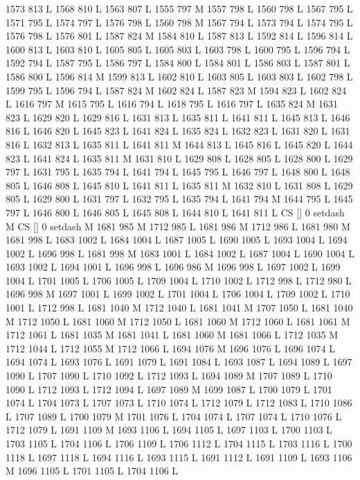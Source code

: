 {{{{{{{{{{{{{{{{{{{{{{{{{{{1573 813 L
1568 810 L
1563 807 L
1555 797 M 1557 798 L
1560 798 L
1567 795 L
1571 795 L
1574 797 L
1576 798 L
1560 798 M 1567 794 L
1573 794 L
1574 795 L
1576 798 L
1576 801 L
1587 824 M 1584 810 L
1587 813 L
1592 814 L
1596 814 L
1600 813 L
1603 810 L
1605 805 L
1605 803 L
1603 798 L
1600 795 L
1596 794 L
1592 794 L
1587 795 L
1586 797 L
1584 800 L
1584 801 L
1586 803 L
1587 801 L
1586 800 L
1596 814 M 1599 813 L
1602 810 L
1603 805 L
1603 803 L
1602 798 L
1599 795 L
1596 794 L
1587 824 M 1602 824 L
1587 823 M 1594 823 L
1602 824 L
1616 797 M 1615 795 L
1616 794 L
1618 795 L
1616 797 L
1635 824 M 1631 823 L
1629 820 L
1629 816 L
1631 813 L
1635 811 L
1641 811 L
1645 813 L
1646 816 L
1646 820 L
1645 823 L
1641 824 L
1635 824 L
1632 823 L
1631 820 L
1631 816 L
1632 813 L
1635 811 L
1641 811 M 1644 813 L
1645 816 L
1645 820 L
1644 823 L
1641 824 L
1635 811 M 1631 810 L
1629 808 L
1628 805 L
1628 800 L
1629 797 L
1631 795 L
1635 794 L
1641 794 L
1645 795 L
1646 797 L
1648 800 L
1648 805 L
1646 808 L
1645 810 L
1641 811 L
1635 811 M 1632 810 L
1631 808 L
1629 805 L
1629 800 L
1631 797 L
1632 795 L
1635 794 L
1641 794 M 1644 795 L
1645 797 L
1646 800 L
1646 805 L
1645 808 L
1644 810 L
1641 811 L
CS [] 0 setdash M
CS [] 0 setdash M
1681 985 M 1712 985 L
1681 986 M 1712 986 L
1681 980 M 1681 998 L
1683 1002 L
1684 1004 L
1687 1005 L
1690 1005 L
1693 1004 L
1694 1002 L
1696 998 L
1681 998 M 1683 1001 L
1684 1002 L
1687 1004 L
1690 1004 L
1693 1002 L
1694 1001 L
1696 998 L
1696 986 M 1696 998 L
1697 1002 L
1699 1004 L
1701 1005 L
1706 1005 L
1709 1004 L
1710 1002 L
1712 998 L
1712 980 L
1696 998 M 1697 1001 L
1699 1002 L
1701 1004 L
1706 1004 L
1709 1002 L
1710 1001 L
1712 998 L
1681 1040 M 1712 1040 L
1681 1041 M 1707 1050 L
1681 1040 M 1712 1050 L
1681 1060 M 1712 1050 L
1681 1060 M 1712 1060 L
1681 1061 M 1712 1061 L
1681 1035 M 1681 1041 L
1681 1060 M 1681 1066 L
1712 1035 M 1712 1044 L
1712 1055 M 1712 1066 L
1694 1076 M 1696 1076 L
1696 1074 L
1694 1074 L
1693 1076 L
1691 1079 L
1691 1084 L
1693 1087 L
1694 1089 L
1697 1090 L
1707 1090 L
1710 1092 L
1712 1093 L
1694 1089 M 1707 1089 L
1710 1090 L
1712 1093 L
1712 1094 L
1697 1089 M 1699 1087 L
1700 1079 L
1701 1074 L
1704 1073 L
1707 1073 L
1710 1074 L
1712 1079 L
1712 1083 L
1710 1086 L
1707 1089 L
1700 1079 M 1701 1076 L
1704 1074 L
1707 1074 L
1710 1076 L
1712 1079 L
1691 1109 M 1693 1106 L
1694 1105 L
1697 1103 L
1700 1103 L
1703 1105 L
1704 1106 L
1706 1109 L
1706 1112 L
1704 1115 L
1703 1116 L
1700 1118 L
1697 1118 L
1694 1116 L
1693 1115 L
1691 1112 L
1691 1109 L
1693 1106 M 1696 1105 L
1701 1105 L
1704 1106 L
}}}}}}}}}}}}}}}}}}}}}}}}}}}

